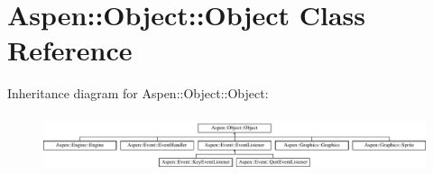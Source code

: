 \hypertarget{class_aspen_1_1_object_1_1_object}{\section{Aspen\-:\-:Object\-:\-:Object Class Reference}
\label{class_aspen_1_1_object_1_1_object}
}
Inheritance diagram for Aspen\-:\-:Object\-:\-:Object\-:\begin{figure}[H]
\begin{center}
\leavevmode
\includegraphics[height=1.680000cm]{dc/df6/class_aspen_1_1_object_1_1_object}
\end{center}
\end{figure}
